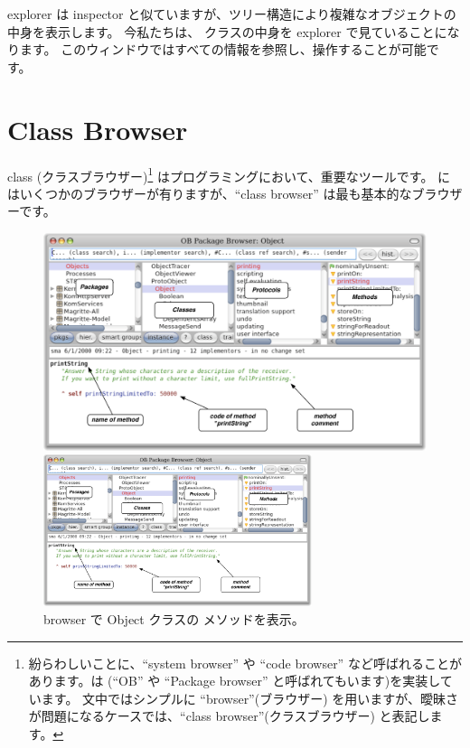 \documentclass[a4paper,10pt,twoside]{book}
\begin{document}
explorer は inspector と似ていますが、ツリー構造により複雑なオブジェクトの中身を表示します。
今私たちは、 クラスの中身を explorer で見ていることになります。
このウィンドウではすべての情報を参照し、操作することが可能です。

\section{Class Browser}

class (クラスブラウザー)\footnote{紛らわしいことに、``system browser'' や ``code browser'' など呼ばれることがあります。\pharo は  (``OB'' や ``Package browser'' と呼ばれてもいます)を実装しています。
文中ではシンプルに ``browser''(ブラウザー) を用いますが、曖昧さが問題になるケースでは、``class browser''(クラスブラウザー) と表記します。} はプログラミングにおいて、重要なツールです。
\pharo にはいくつかのブラウザーが有りますが、``class browser'' は最も基本的なブラウザーです。


\begin{figure}[htb]
\ifluluelse
	{\centerline {\includegraphics[width=\textwidth]{ClassBrowser1}}}
	{\centerline {\includegraphics[width=0.7\textwidth]{ClassBrowser1}}}
\caption{browser で Object クラスの  メソッドを表示。
}
\end{figure}
\end{document}
